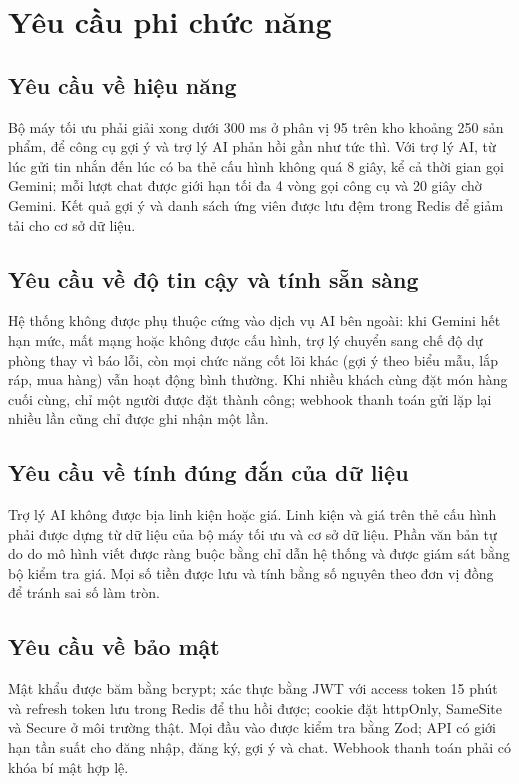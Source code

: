 \section{Yêu cầu phi chức năng}

\subsection{Yêu cầu về hiệu năng}
Bộ máy tối ưu phải giải xong dưới 300 ms ở phân vị 95 trên kho khoảng 250 sản phẩm, để công cụ gợi ý và trợ lý AI phản hồi gần như tức thì. Với trợ lý AI, từ lúc gửi tin nhắn đến lúc có ba thẻ cấu hình không quá 8 giây, kể cả thời gian gọi Gemini; mỗi lượt chat được giới hạn tối đa 4 vòng gọi công cụ và 20 giây chờ Gemini. Kết quả gợi ý và danh sách ứng viên được lưu đệm trong Redis để giảm tải cho cơ sở dữ liệu.

\subsection{Yêu cầu về độ tin cậy và tính sẵn sàng}
Hệ thống không được phụ thuộc cứng vào dịch vụ AI bên ngoài: khi Gemini hết hạn mức, mất mạng hoặc không được cấu hình, trợ lý chuyển sang chế độ dự phòng thay vì báo lỗi, còn mọi chức năng cốt lõi khác (gợi ý theo biểu mẫu, lắp ráp, mua hàng) vẫn hoạt động bình thường. Khi nhiều khách cùng đặt món hàng cuối cùng, chỉ một người được đặt thành công; webhook thanh toán gửi lặp lại nhiều lần cũng chỉ được ghi nhận một lần.

\subsection{Yêu cầu về tính đúng đắn của dữ liệu}
Trợ lý AI không được bịa linh kiện hoặc giá. Linh kiện và giá trên thẻ cấu hình phải được dựng từ dữ liệu của bộ máy tối ưu và cơ sở dữ liệu. Phần văn bản tự do do mô hình viết được ràng buộc bằng chỉ dẫn hệ thống và được giám sát bằng bộ kiểm tra giá. Mọi số tiền được lưu và tính bằng số nguyên theo đơn vị đồng để tránh sai số làm tròn.

\subsection{Yêu cầu về bảo mật}
Mật khẩu được băm bằng bcrypt; xác thực bằng JWT với access token 15 phút và refresh token lưu trong Redis để thu hồi được; cookie đặt httpOnly, SameSite và Secure ở môi trường thật. Mọi đầu vào được kiểm tra bằng Zod; API có giới hạn tần suất cho đăng nhập, đăng ký, gợi ý và chat. Webhook thanh toán phải có khóa bí mật hợp lệ.


